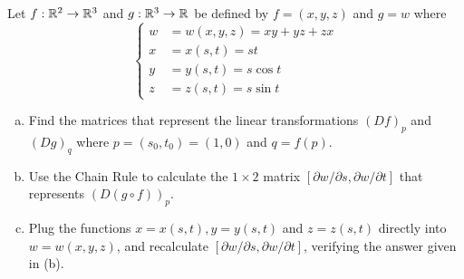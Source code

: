 \documentclass[a4paper, 12pt]{article}
\begin{document}
\begin{problem} 
Let $f: \mathbb{R}^2 \to \mathbb{R}^3$ and $g: \mathbb{R}^3 \to \mathbb{R}$ be defined by $f = (x, y, z)$ and $g = w$ where \[
    \begin{cases}
        w & = w(x, y, z) = xy + yz + zx \\
        x & = x(s, t) = st              \\
        y & = y(s, t) = s\cos t         \\
        z & = z(s, t) = s\sin t
    \end{cases}
\]
\begin{enumerate} [(a)]
    \item Find the matrices that represent the linear transformations $(Df)_p$ and $(Dg)_q$ where $p = (s_0, t_0) = (1, 0)$ and $q = f(p)$.
    \item Use the Chain Rule to calculate the $1 \times 2$ matrix $[\partial w/\partial s, \partial w/\partial t]$ that represents $(D(g \circ f))_p$.
    \item Plug the functions $x = x(s, t), y = y(s, t)$ and $z = z(s, t)$ directly into $w = w(x, y, z)$, and recalculate $[\partial w/\partial s, \partial w/\partial t]$, verifying the answer given in (b).
\end{enumerate}
\end{problem}
\end{document}
